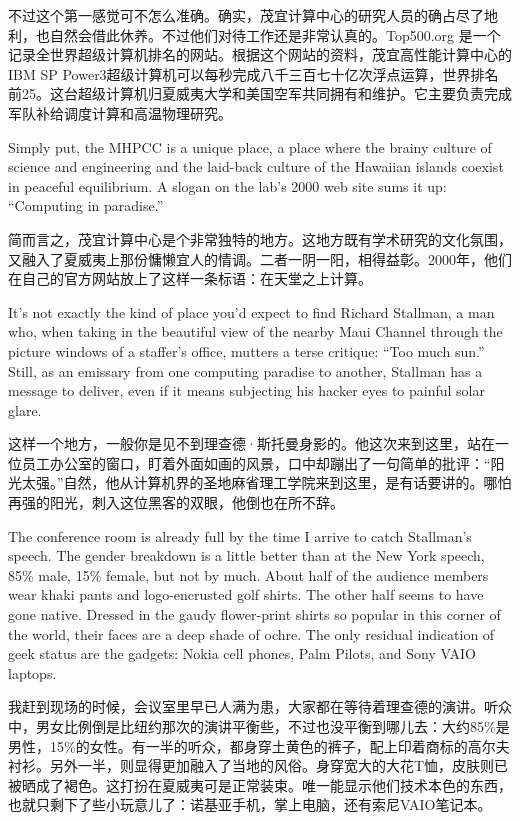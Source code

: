 \ifdefined\chs
不过这个第一感觉可不怎么准确。确实，茂宜计算中心的研究人员的确占尽了地利，也自然会借此休养。不过他们对待工作还是非常认真的。Top500.org 是一个记录全世界超级计算机排名的网站。根据这个网站的资料，茂宜高性能计算中心的IBM SP Power3超级计算机可以每秒完成八千三百七十亿次浮点运算，世界排名前25。这台超级计算机归夏威夷大学和美国空军共同拥有和维护。它主要负责完成军队补给调度计算和高温物理研究。
\fi

\ifdefined\eng
Simply put, the MHPCC is a unique place, a place where the brainy culture of science and engineering and the laid-back culture of the Hawaiian islands coexist in peaceful equilibrium. A slogan on the lab's 2000 web site sums it up: ``Computing in paradise.''
\fi

\ifdefined\chs
简而言之，茂宜计算中心是个非常独特的地方。这地方既有学术研究的文化氛围，又融入了夏威夷上那份慵懒宜人的情调。二者一阴一阳，相得益彰。2000年，他们在自己的官方网站放上了这样一条标语：在天堂之上计算。
\fi

\ifdefined\eng
It's not exactly the kind of place you'd expect to find Richard Stallman, a man who, when taking in the beautiful view of the nearby Maui Channel through the picture windows of a staffer's office, mutters a terse critique: ``Too much sun.'' Still, as an emissary from one computing paradise to another, Stallman has a message to deliver, even if it means subjecting his hacker eyes to painful solar glare.
\fi

\ifdefined\chs
这样一个地方，一般你是见不到理查德·斯托曼身影的。他这次来到这里，站在一位员工办公室的窗口，盯着外面如画的风景，口中却蹦出了一句简单的批评：``阳光太强。''自然，他从计算机界的圣地麻省理工学院来到这里，是有话要讲的。哪怕再强的阳光，刺入这位黑客的双眼，他倒也在所不辞。
\fi

\ifdefined\eng
The conference room is already full by the time I arrive to catch Stallman's speech. The gender breakdown is a little better than at the New York speech, 85\% male, 15\% female, but not by much. About half of the audience members wear khaki pants and logo-encrusted golf shirts. The other half seems to have gone native. Dressed in the gaudy flower-print shirts so popular in this corner of the world, their faces are a deep shade of ochre. The only residual indication of geek status are the gadgets: Nokia cell phones, Palm Pilots, and Sony VAIO laptops.
\fi

\ifdefined\chs
我赶到现场的时候，会议室里早已人满为患，大家都在等待着理查德的演讲。听众中，男女比例倒是比纽约那次的演讲平衡些，不过也没平衡到哪儿去：大约85\%是男性，15\%的女性。有一半的听众，都身穿土黄色的裤子，配上印着商标的高尔夫衬衫。另外一半，则显得更加融入了当地的风俗。身穿宽大的大花T恤，皮肤则已被晒成了褐色。这打扮在夏威夷可是正常装束。唯一能显示他们技术本色的东西，也就只剩下了些小玩意儿了：诺基亚手机，掌上电脑，还有索尼VAIO笔记本。
\fi

